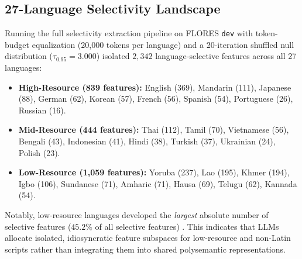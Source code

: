 \documentclass[11pt]{article}
\begin{document}
\subsection{27-Language Selectivity Landscape}
Running the full selectivity extraction pipeline on FLORES \texttt{dev} with token-budget equalization (20,000 tokens per language) and a 20-iteration shuffled null distribution ($\tau_{0.95} = 3.000$) isolated $2,342$ language-selective features across all 27 languages:
\begin{itemize}
    \item \textbf{High-Resource (839 features):} English (369), Mandarin (111), Japanese (88), German (62), Korean (57), French (56), Spanish (54), Portuguese (26), Russian (16).
    \item \textbf{Mid-Resource (444 features):} Thai (112), Tamil (70), Vietnamese (56), Bengali (43), Indonesian (41), Hindi (38), Turkish (37), Ukrainian (24), Polish (23).
    \item \textbf{Low-Resource (1,059 features):} Yoruba (237), Lao (195), Khmer (194), Igbo (106), Sundanese (71), Amharic (71), Hausa (69), Telugu (62), Kannada (54).
\end{itemize}
Notably, low-resource languages developed the \emph{largest} absolute number of selective features ($45.2\%$ of all selective features) %
. This indicates that LLMs allocate isolated, idiosyncratic feature subspaces for low-resource and non-Latin scripts rather than integrating them into shared polysemantic representations.
\end{document}
